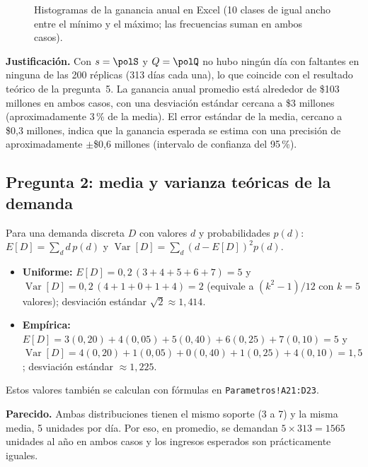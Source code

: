 \begin{figure}[H]
\centering
\begin{subfigure}{0.49\textwidth}
\end{subfigure}\hfill
\begin{subfigure}{0.49\textwidth}
\end{subfigure}
\caption{Histogramas de la ganancia anual en Excel (10 clases de igual ancho entre el mínimo y
el máximo; las frecuencias suman \xlUFreqTotal{} en ambos casos).}
\label{fig:histExcel}
\end{figure}

\textbf{Justificación.} Con $s=\polS$ y $Q=\polQ$ no hubo ningún día con faltantes en ninguna
de las 200 réplicas (313 días cada una), lo que coincide con el resultado teórico de la
pregunta~5. La ganancia anual promedio está alrededor de \$103 millones en ambos casos, con una
desviación estándar cercana a \$3 millones (aproximadamente 3\,\% de la media). El error
estándar de la media, cercano a \$0,3 millones, indica que la ganancia esperada se estima con
una precisión de aproximadamente $\pm$\$0,6 millones (intervalo de confianza del 95\,\%).

\subsection{Pregunta 2: media y varianza teóricas de la demanda}

Para una demanda discreta $D$ con valores $d$ y probabilidades $p(d)$:
$E[D]=\sum_d d\,p(d)$ y $\operatorname{Var}[D]=\sum_d (d-E[D])^2 p(d)$.

\begin{itemize}
  \item \textbf{Uniforme:} $E[D]=0{,}2\,(3+4+5+6+7)=5$ y
  $\operatorname{Var}[D]=0{,}2\,(4+1+0+1+4)=2$ (equivale a $(k^2-1)/12$ con $k=5$ valores);
  desviación estándar $\sqrt2\approx1{,}414$.
  \item \textbf{Empírica:} $E[D]=3(0{,}20)+4(0{,}05)+5(0{,}40)+6(0{,}25)+7(0{,}10)=5$ y
  $\operatorname{Var}[D]=4(0{,}20)+1(0{,}05)+0(0{,}40)+1(0{,}25)+4(0{,}10)=1{,}5$;
  desviación estándar $\approx1{,}225$.
\end{itemize}

Estos valores también se calculan con fórmulas en \texttt{Parametros!A21:D23}.

\textbf{Parecido.} Ambas distribuciones tienen el mismo soporte (3 a 7) y la misma media, 5
unidades por día. Por eso, en promedio, se demandan $5\times313=1565$ unidades al año en ambos
casos y los ingresos esperados son prácticamente iguales.

